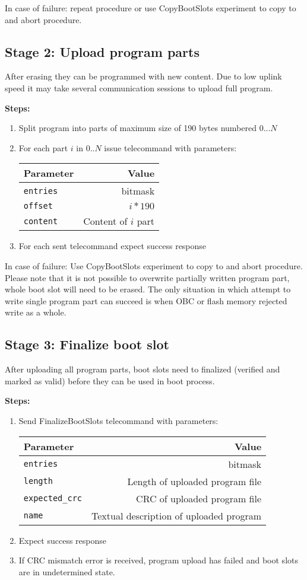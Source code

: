 In case of failure: repeat procedure or use CopyBootSlots experiment to copy \currentbs{} to \targetbs{} and abort procedure.

\subsection{Stage 2: Upload program parts}
After erasing \targetbs{} they can be programmed with new content. Due to low uplink speed it may take several communication sessions to upload full program.

\textbf{Steps:}
\begin{enumerate}
	\item Split program into parts of maximum size of 190 bytes numbered $0...N$
	\item For each part $i$ in $0..N$ issue  telecommand with parameters:
	
		\begin{tabular}{l|r}
			Parameter & Value \\
			\hline
			\texttt{entries} & \targetbs{} bitmask \\ 
			\texttt{offset} & $i * 190$ \\
			\texttt{content} & Content of $i$ part
		\end{tabular}
	\item For each sent telecommand expect success response 
\end{enumerate}

In case of failure: Use CopyBootSlots experiment to copy \currentbs{} to \targetbs{} and abort procedure. Please note that it is not possible to overwrite partially written program part, whole boot slot will need to be erased. The only situation in which attempt to write single program part can succeed is when OBC or flash memory rejected write as a whole.

\subsection{Stage 3: Finalize boot slot}
After uploading all program parts, boot slots need to finalized (verified and marked as valid) before they can be used in boot process.

\textbf{Steps:}
\begin{enumerate}
	\item Send FinalizeBootSlots telecommand with parameters:
	
		\begin{tabular}{l|r}
			Parameter & Value \\
			\hline
			\texttt{entries} & \targetbs{} bitmask \\ 
			\texttt{length} & Length of uploaded program file \\
			\texttt{expected\_crc} & CRC of uploaded program file \\
			\texttt{name} & Textual description of uploaded program
		\end{tabular}
	\item Expect success response
	\item If CRC mismatch error is received, program upload has failed and boot slots are in undetermined state.
\end{enumerate}

